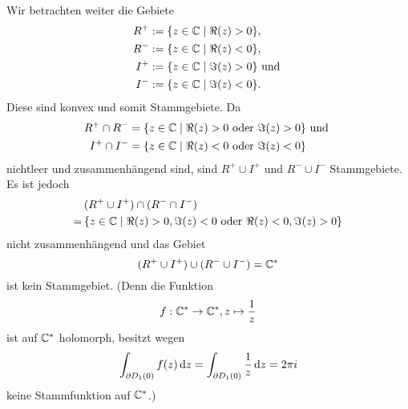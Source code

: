 \documentclass[a4paper,10pt]{article}
\begin{document}
Wir betrachten weiter die Gebiete
\begin{align*}
 R^+ &:= \{z \in \mathbb{C} \mid \Re(z) > 0\}, \\
 R^- &:= \{z \in \mathbb{C} \mid \Re(z) < 0\}, \\
 I^+ &:= \{z \in \mathbb{C} \mid \Im(z) > 0\} \text{ und } \\
 I^- &:= \{z \in \mathbb{C} \mid \Im(z) < 0\}.
\end{align*}
Diese sind konvex und somit Stammgebiete. Da
\begin{align*}
 R^+ \cap R^- &= \{z \in \mathbb{C} \mid \Re(z) > 0 \text{ oder } \Im(z) > 0\} \text{ und } \\
 I^+ \cap I^- &= \{z \in \mathbb{C} \mid \Re(z) < 0 \text{ oder } \Im(z) < 0\}
\end{align*}
nichtleer und zusammenhängend sind, sind $R^+ \cup I^+$ und $R^- \cup I^-$ Stammgebiete. Es ist jedoch
\begin{align*}
  &\, (R^+ \cup I^+) \cap (R^- \cap I^-) \\
 =&\,  \{z \in \mathbb{C} \mid \Re(z) > 0, \Im(z) < 0 \text{ oder } \Re(z) < 0, \Im(z) > 0\}
\end{align*}
nicht zusammenhängend und das Gebiet
\[
 (R^+ \cup I^+) \cup (R^- \cup I^-) = \mathbb{C}^*
\]
ist kein Stammgebiet. (Denn die Funktion
\[
 f : \mathbb{C}^* \to \mathbb{C}^*, z \mapsto \frac{1}{z}
\]
ist auf $\mathbb{C}^*$ holomorph, besitzt wegen
\[
 \int_{\partial D_1(0)} f(z) \,\text{d}z
 = \int_{\partial D_1(0)} \frac{1}{z} \,\text{d}z
 = 2 \pi i
\]
keine Stammfunktion auf $\mathbb{C}^*$.)
\end{document}
